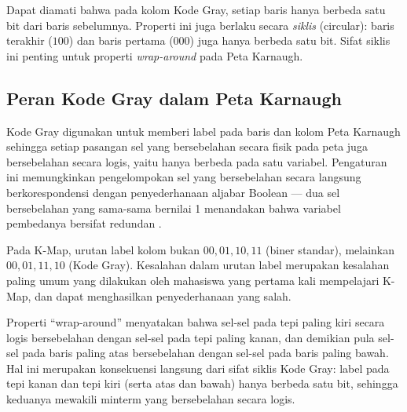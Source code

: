 Dapat diamati bahwa pada kolom Kode Gray, setiap baris hanya berbeda satu bit dari baris sebelumnya. Properti ini juga berlaku secara \textit{siklis} (circular): baris terakhir ($100$) dan baris pertama ($000$) juga hanya berbeda satu bit. Sifat siklis ini penting untuk properti \textit{wrap-around} pada Peta Karnaugh.

\subsection{Peran Kode Gray dalam Peta Karnaugh}

Kode Gray digunakan untuk memberi label pada baris dan kolom Peta Karnaugh sehingga setiap pasangan sel yang bersebelahan secara fisik pada peta juga bersebelahan secara logis, yaitu hanya berbeda pada satu variabel. Pengaturan ini memungkinkan pengelompokan sel yang bersebelahan secara langsung berkorespondensi dengan penyederhanaan aljabar Boolean --- dua sel bersebelahan yang sama-sama bernilai 1 menandakan bahwa variabel pembedanya bersifat redundan \cite{wiki_karnaugh}.

\begin{catatan}
Pada K-Map, urutan label kolom bukan $00, 01, 10, 11$ (biner standar), melainkan $00, 01, 11, 10$ (Kode Gray). Kesalahan dalam urutan label merupakan kesalahan paling umum yang dilakukan oleh mahasiswa yang pertama kali mempelajari K-Map, dan dapat menghasilkan penyederhanaan yang salah.
\end{catatan}

Properti ``wrap-around'' menyatakan bahwa sel-sel pada tepi paling kiri secara logis bersebelahan dengan sel-sel pada tepi paling kanan, dan demikian pula sel-sel pada baris paling atas bersebelahan dengan sel-sel pada baris paling bawah. Hal ini merupakan konsekuensi langsung dari sifat siklis Kode Gray: label pada tepi kanan dan tepi kiri (serta atas dan bawah) hanya berbeda satu bit, sehingga keduanya mewakili minterm yang bersebelahan secara logis.

